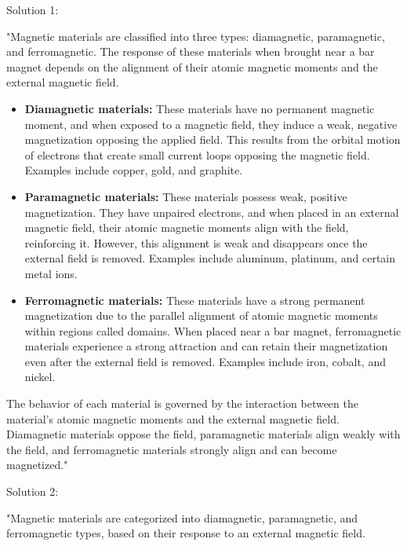 Solution 1: 

"Magnetic materials are classified into three types: diamagnetic, paramagnetic, and ferromagnetic. The response of these materials when brought near a bar magnet depends on the alignment of their atomic magnetic moments and the external magnetic field.

\begin{itemize}
    \item \textbf{Diamagnetic materials:} These materials have no permanent magnetic moment, and when exposed to a magnetic field, they induce a weak, negative magnetization opposing the applied field. This results from the orbital motion of electrons that create small current loops opposing the magnetic field. Examples include copper, gold, and graphite.
    \item \textbf{Paramagnetic materials:} These materials possess weak, positive magnetization. They have unpaired electrons, and when placed in an external magnetic field, their atomic magnetic moments align with the field, reinforcing it. However, this alignment is weak and disappears once the external field is removed. Examples include aluminum, platinum, and certain metal ions.
    \item \textbf{Ferromagnetic materials:} These materials have a strong permanent magnetization due to the parallel alignment of atomic magnetic moments within regions called domains. When placed near a bar magnet, ferromagnetic materials experience a strong attraction and can retain their magnetization even after the external field is removed. Examples include iron, cobalt, and nickel.
\end{itemize}

The behavior of each material is governed by the interaction between the material's atomic magnetic moments and the external magnetic field. Diamagnetic materials oppose the field, paramagnetic materials align weakly with the field, and ferromagnetic materials strongly align and can become magnetized."

Solution 2: 

"Magnetic materials are categorized into diamagnetic, paramagnetic, and ferromagnetic types, based on their response to an external magnetic field.

